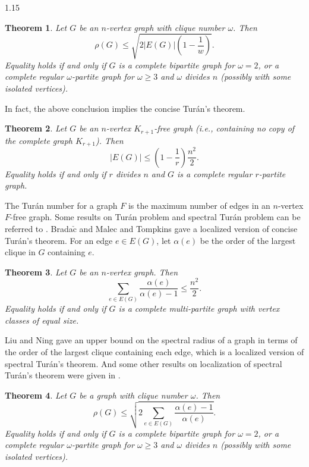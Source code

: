 \documentclass[preprint,12pt]{elsarticle1}
\newtheorem{thm}{Theorem}[section]
\numberwithin{equation}{section}
\begin{document}
\begin{spacing}{1.15}
\begin{thm}\cite{nikiforov2002}\label{niki}
Let $G$ be an $n$-vertex graph with clique number $\omega$. Then
$$\rho(G)\le\sqrt{2|E(G)|\left(1-\frac{1}{w}\right)}.$$
Equality holds if and only if $G$ is a complete bipartite graph for $\omega=2$, or a complete regular $\omega$-partite graph for $\omega\ge3$ and $\omega$ divides $n$ (possibly with some isolated vertices).
\end{thm}

In fact, the above conclusion implies the concise Tur\'{a}n's theorem.

\begin{thm}\cite{turan1961research}
Let $G$ be an $n$-vertex $K_{r+1}$-free graph (i.e., containing no copy of the complete graph $K_{r+1}$). Then $$|E(G)|\le\left(1-\frac{1}{r}\right)\frac{n^2}{2}.$$ Equality holds if and only if $r$ divides $n$ and $G$ is a complete regular $r$-partite graph.
\end{thm}

The Tur\'{a}n number for a graph $F$ is the maximum number of edges in an $n$-vertex $F$-free graph. Some results on Tur\'{a}n problem and spectral Tur\'{a}n problem can be referred to \cite{alonjctb2024,cioaba,jctb2023,wilf}.
Brada$\check{\mathrm{c}}$ \cite{local1} and Malec and Tompkins \cite{1local2023} gave a localized version of concise Tur\'{a}n's theorem.
For an edge $e\in E(G)$, let $\alpha(e)$ be the order of the largest clique in $G$ containing $e$.

\begin{thm}\cite{local1,1local2023}\label{local1}
Let $G$ be an $n$-vertex graph. Then
$$\sum_{e\in E(G)}\frac{\alpha(e)}{\alpha(e)-1}\le\frac{n^2}{2}.$$
Equality holds if and only if $G$ is a complete multi-partite graph with vertex classes of equal size.
\end{thm}

Liu and Ning \cite{liulelejctb} gave an upper bound on the spectral radius of a graph in terms of the order of the largest clique containing each edge, which is a localized version of spectral Tur\'{a}n's theorem. And some other results on localization of spectral Tur\'{a}n's theorem were given in \cite{liulelearxiv}.

\begin{thm}\cite{liulelejctb}\label{liulelejctb}
Let $G$ be a graph with clique number $\omega$. Then
$$\rho(G)\le\sqrt{2\sum_{e\in E(G)}\frac{\alpha(e)-1}{\alpha(e)}}.$$
Equality holds if and only if $G$ is a complete bipartite graph for $\omega=2$, or a complete regular $\omega$-partite graph for $\omega\ge3$ and $\omega$ divides $n$ (possibly with some isolated vertices).
\end{thm}


\end{spacing}
\end{document}
